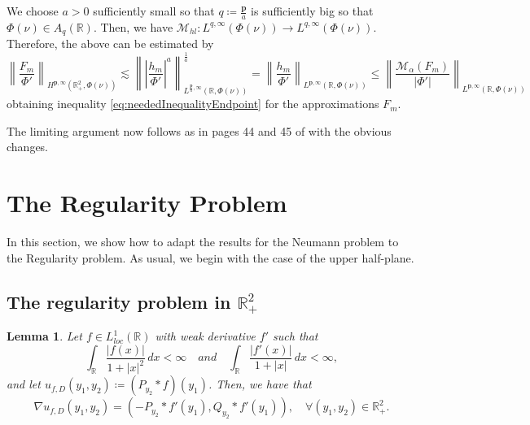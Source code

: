 \documentclass[12pt]{amsart}
\newcommand{\R}{\mathbb{R}}
\theoremstyle{plain}
\newtheorem{lemma}[theorem]{Lemma}
\theoremstyle{definition}
\numberwithin{equation}{section}
\begin{document}
We choose $a>0$ sufficiently small so that $q\coloneqq \frac{\bm{p}}{a}$ is sufficiently big so that $\Phi(\nu)\in A_q(\R)$. Then, we have $\mathcal{M}_{hl}\colon L^{q,\infty}(\Phi(\nu))\to L^{q,\infty}(\Phi(\nu))$. Therefore, the above can be estimated by
\begin{equation}\label{eq:referenciaParaElPasoLímite}
    \left\|\frac{F_m}{\Phi'}\right\|_{H^{\bm{p},\infty}(\R_{+}^{2},\Phi(\nu))}
    \lesssim 
    \left\|
    \left|\frac{h_m}{\Phi'}\right|^{a}
    \right\|_{L^{\frac{\bm{p}}{a},\infty}(\R,\Phi(\nu))}^{\frac{1}{a}}
    =
    \left\|\frac{h_m}{\Phi'}\right\|_{L^{\bm{p},\infty}(\R,\Phi(\nu))}
    \leq 
    \left\|\frac{\mathcal{M}_{\alpha}(F_m)}{|\Phi'|}\right\|_{L^{\bm{p},\infty}(\R,\Phi(\nu))}
\end{equation}
obtaining inequality \eqref{eq:neededInequalityEndpoint} for the approximations $F_m$.

The limiting argument now follows as in pages 44 and 45 of \cite{CNO} with the obvious changes. 








\section{The Regularity Problem}\label{section:regularity}

In this section, we show how to adapt the results for the Neumann problem to the Regularity problem. As usual, we begin with the case of the upper half-plane.




\subsection{The regularity problem in \texorpdfstring{$\R_{+}^{2}$}{}}



\begin{lemma}\label{lemma:calculoGradienteRegularidad}
    Let $f\in L^1_{loc}(\R)$ with weak derivative $f'$ such that
     \begin{equation}\label{eq:integrabilityWeakDerivative}
    \int_{\R}\frac{|f(x)|}{1+|x|^2}\, dx<\infty\quad{and}\quad  \int_{\R}\frac{|f'(x)|}{1+|x|}\, dx<\infty,
    \end{equation}
    and let $u_{f,D}(y_1,y_2) \coloneqq (P_{y_2}\ast f)(y_1)$. 
    Then, we have that 
    \begin{equation}\label{eq:gradientPoisson}
    \nabla u_{f,D}(y_1,y_2)
    =
    \left(-P_{y_2}\ast f'(y_1), Q_{y_2}\ast f'(y_1)\right), \quad\forall (y_1,y_2)\in \R_{+}^{2}.        
    \end{equation}
\end{lemma}
\end{document}
